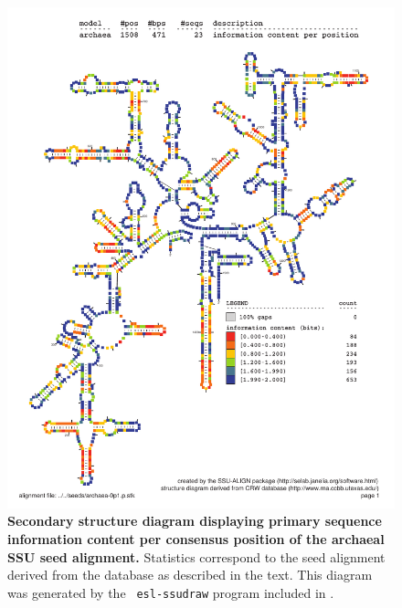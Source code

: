 \begin{figure}
\begin{center}
\includegraphics[width=5.7in]{Figures/archaea-0p1-info}
\end{center}
\caption[Secondary structure diagram displaying primary sequence
  information content per consensus position of the archaeal SSU seed
  alignment]{\textbf{Secondary structure diagram displaying primary
  sequence information content per consensus position of the archaeal SSU seed
  alignment.} Statistics correspond to the  seed
  alignment derived from the  database \cite{CannoneGutell02}
  as described in the text. This diagram was generated by the {\tt
  esl-ssudraw} program included in .}
\label{fig:arcinfo}
\end{figure}

